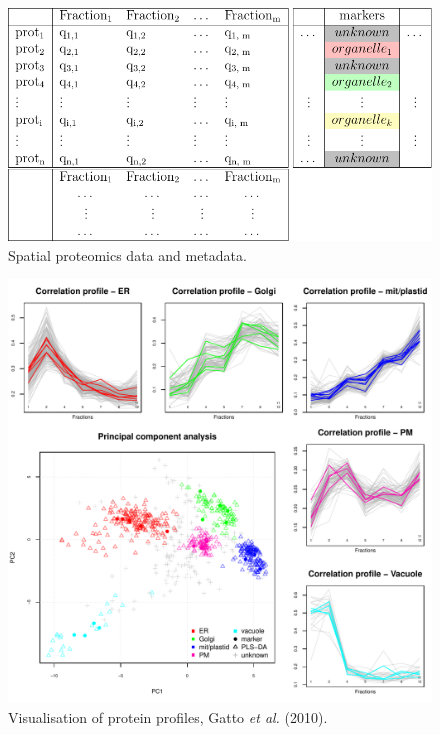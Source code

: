 \documentclass[presentation]{beamer}
\begin{document}
\begin{frame}
  \begin{figure}[h]
    \centering
    \includegraphics[width=.8\linewidth]{./figures/Fig1-data-a.pdf}
    \caption{Spatial proteomics data and metadata.}
  \end{figure}
\end{frame}

\begin{frame}
  \begin{figure}[h]
    \centering
    \includegraphics[width=.7\linewidth]{./figures/vis.pdf}
    \caption{Visualisation of protein profiles, Gatto \textit{et al.} (2010).}
  \end{figure}
\end{frame}
\end{document}
